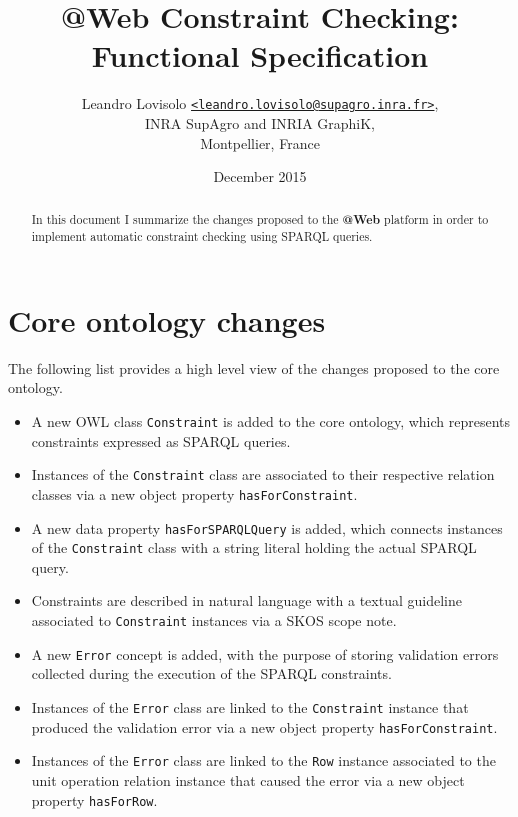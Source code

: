 \documentclass[a4paper, 10pt]{article}
\makeatletter
\newcommand{\atweb}{\textbf{@Web}\xspace}
\newcommand{\code}[1]{\texttt{#1}}
\makeatother
\begin{document}
\title{
  \atweb Constraint Checking: \\
  Functional Specification
}
\author{
  Leandro Lovisolo
  \texttt{\href{mailto:leandro.lovisolo@supagro.inra.fr}
               {<leandro.lovisolo@supagro.inra.fr>}}, \\
  INRA SupAgro and INRIA GraphiK, \\
  Montpellier, France
}
\date{December 2015}

\maketitle

\begin{abstract}
  In this document I summarize the changes proposed to the \atweb platform in
  order to implement automatic constraint checking using SPARQL queries.
\end{abstract}


\section{Core ontology changes}

The following list provides a high level view of the changes proposed to the
core ontology.

\begin{itemize}
  \item A new OWL class \code{Constraint} is added to the core ontology,
  which represents constraints expressed as SPARQL queries.

  \item Instances of the \code{Constraint} class are associated to their
  respective relation classes via a new object property
  \code{hasForConstraint}.

  \item A new data property \code{hasForSPARQLQuery} is added, which connects
  instances of the \code{Constraint} class with a string literal holding the
  actual SPARQL query.

  \item Constraints are described in natural language with a textual guideline
  associated to \code{Constraint} instances via a SKOS scope note.

  \item A new \code{Error} concept is added, with the purpose of storing
    validation errors collected during the execution of the SPARQL constraints.

  \item Instances of the \code{Error} class are linked to the \code{Constraint}
    instance that produced the validation error via a new object property
    \code{hasForConstraint}.

  \item Instances of the \code{Error} class are linked to the \code{Row}
    instance associated to the unit operation relation instance that caused the
    error via a new object property \code{hasForRow}.
\end{itemize}
\end{document}
